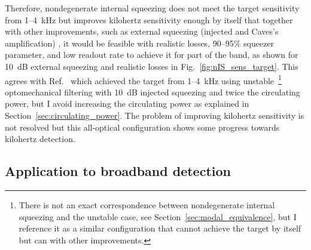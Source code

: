 Therefore, nondegenerate internal squeezing does not meet the target sensitivity from 1--4~kHz but improves kilohertz sensitivity enough by itself that together with other improvements, such as external squeezing (injected and Caves's amplification) , it would be feasible with realistic losses, 90--95$\%$ squeezer parameter, and low readout rate  to achieve it for part of the band, as shown for 10~dB external squeezing and realistic losses in Fig.~\ref{fig:nIS_sens_target}. This agrees with Ref.~\cite{Miao2018} which achieved the target from 1--4~kHz using unstable~\footnote{There is not an exact correspondence between nondegenerate internal squeezing and the unstable case, see Section~\ref{sec:modal_equivalence}, but I reference it as a similar configuration that cannot achieve the target by itself but can with other improvements.} optomechanical filtering with 10~dB injected squeezing and twice the circulating power, but I avoid increasing the circulating power as explained in Section~\ref{sec:circulating_power}. The problem of improving kilohertz sensitivity is not resolved but this all-optical configuration shows some progress towards kilohertz detection.


\subsection{Application to broadband detection}


